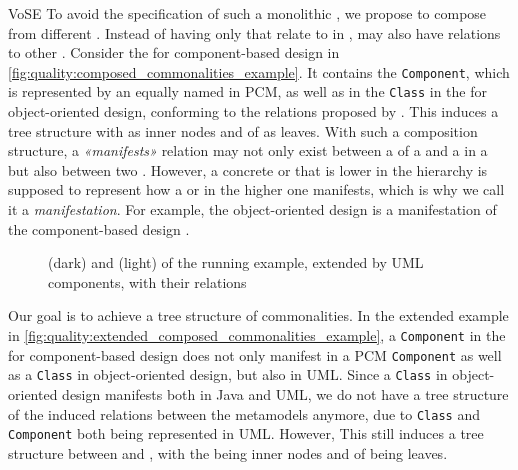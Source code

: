 \begin{copiedFrom}{VoSE}
To avoid the specification of such a monolithic \conceptmetamodel, we propose to compose \commonalities from different \conceptmetamodels.
Instead of having only \commonalities that relate to \metaclasses in \concretemetamodels, \commonalities may also have relations to other \commonalities.
Consider the \conceptmetamodel for component-based design in \autoref{fig:quality:composed_commonalities_example}.
It contains the \commonality \texttt{Component}, which is represented by an equally named \metaclass in \ac{PCM},
as well as in the \commonality \texttt{Class} in the \conceptmetamodel for object-oriented design, conforming to the relations proposed by \textcite{langhammer2015a}.
This induces a tree structure with \commonalities as inner nodes and \metaclasses of \concretemetamodels as leaves.
With such a composition structure, a \emph{«manifests»} relation may not only exist between a %
\commonality of a \conceptmetamodel and a \metaclass in a \concretemetamodel but also between two \commonalities.
However, a concrete or \conceptmetamodel that is lower in the hierarchy is supposed to represent how a \metaclass or \commonality in the higher one manifests, which is why we call it a \emph{manifestation}.
For example, the object-oriented design \conceptmetamodel is a manifestation of the component-based design \conceptmetamodel.

\begin{figure}
    \centering
    
    \caption{\Conceptmetamodels (dark) and \concretemetamodels (light) of the running example, extended by UML components, with their relations}
    \label{fig:quality:extended_composed_commonalities_example}
\end{figure}

Our goal is to achieve a tree structure of commonalities. In the extended example in \autoref{fig:quality:extended_composed_commonalities_example}, a \texttt{Component} in the \conceptmetamodel for component-based design does not only manifest in a \ac{PCM} \texttt{Component} as well as a \texttt{Class} in object-oriented design, but also in \ac{UML}.
Since a \texttt{Class} in object-oriented design manifests both in Java and \ac{UML}, we do not have a tree structure of the induced relations between the metamodels anymore, due to \texttt{Class} and \texttt{Component} both being represented in \ac{UML}.
However, This still induces a tree structure between \metaclasses and \commonalities, with the \commonalities being inner nodes and \metaclasses of \concretemetamodels being leaves.


\end{copiedFrom}
